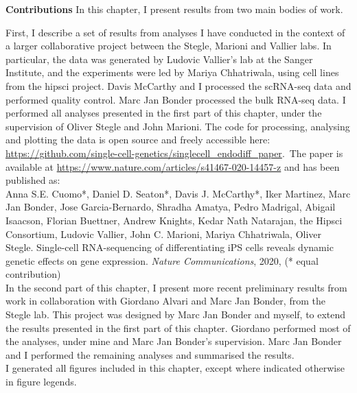 \begin{Comment2}
\hspace{-3mm}\textbf{Contributions} 
In this chapter, I present results from two main bodies of work.

First, I describe a set of results from analyses I have conducted in the context of a larger collaborative project between the Stegle, Marioni and Vallier labs. 
In particular, the data was generated by Ludovic Vallier’s lab at the Sanger Institute, and the experiments were led by Mariya Chhatriwala, using cell lines from the \gls{hipsci} project.
Davis McCarthy and I processed the scRNA-seq data and performed quality control.
Marc Jan Bonder processed the bulk RNA-seq data.
I performed all analyses presented in the first part of this chapter, under the supervision of Oliver Stegle and John Marioni.
The code for processing, analysing and plotting the data is open source and freely accessible here: \url{https://github.com/single-cell-genetics/singlecell\_endodiff\_paper}.\
The paper 
is available at \url{https://www.nature.com/articles/s41467-020-14457-z} and has been published as:\\

Anna S.E. Cuomo*, Daniel D. Seaton*, Davis J. McCarthy*, Iker Martinez, Marc Jan Bonder, Jose Garcia-Bernardo, Shradha Amatya, Pedro Madrigal, Abigail Isaacson, Florian Buettner, Andrew Knights, Kedar Nath Natarajan, the Hipsci Consortium, Ludovic Vallier, John C. Marioni, Mariya Chhatriwala, Oliver Stegle. Single-cell RNA-sequencing of differentiating iPS cells reveals dynamic genetic effects on gene expression. \textit{Nature Communications}, 2020, (* equal contribution)\\


In the second part of this chapter, I present more recent preliminary results from work in collaboration with Giordano Alvari and Marc Jan Bonder, from the Stegle lab.
This project was designed by Marc Jan Bonder and myself, to extend the results presented in the first part of this chapter.
Giordano performed most of the analyses, under mine and Marc Jan Bonder's supervision.
Marc Jan Bonder and I performed the remaining analyses and summarised the results.\\

I generated all figures included in this chapter, except where indicated otherwise in figure legends.
\end{Comment2}


